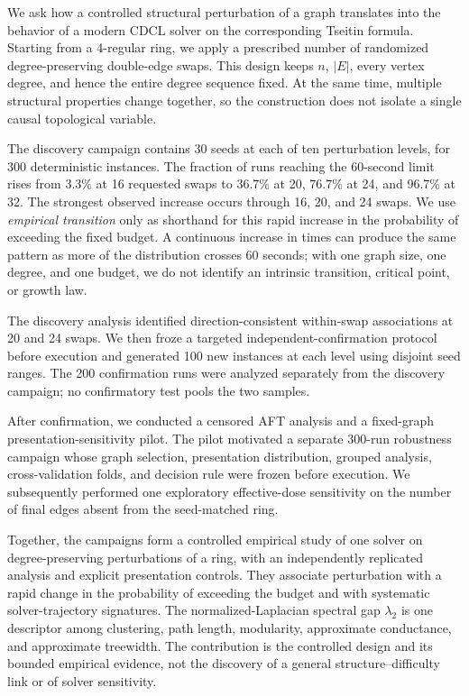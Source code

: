\documentclass[11pt]{article}
\begin{document}
We ask how a controlled structural perturbation of a graph translates into the behavior of a modern CDCL solver on the corresponding Tseitin formula. Starting from a 4-regular ring, we apply a prescribed number of randomized degree-preserving double-edge swaps. This design keeps $n$, $|E|$, every vertex degree, and hence the entire degree sequence fixed. At the same time, multiple structural properties change together, so the construction does not isolate a single causal topological variable.

The discovery campaign contains 30 seeds at each of ten perturbation levels, for 300 deterministic instances. The fraction of runs reaching the 60-second limit rises from 3.3\% at 16 requested swaps to 36.7\% at 20, 76.7\% at 24, and 96.7\% at 32. The strongest observed increase occurs through 16, 20, and 24 swaps. We use \emph{empirical transition} only as shorthand for this rapid increase in the probability of exceeding the fixed budget. A continuous increase in times can produce the same pattern as more of the distribution crosses 60 seconds; with one graph size, one degree, and one budget, we do not identify an intrinsic transition, critical point, or growth law.

The discovery analysis identified direction-consistent within-swap associations at 20 and 24 swaps. We then froze a targeted independent-confirmation protocol before execution and generated 100 new instances at each level using disjoint seed ranges. The 200 confirmation runs were analyzed separately from the discovery campaign; no confirmatory test pools the two samples.

After confirmation, we conducted a censored AFT analysis and a fixed-graph presentation-sensitivity pilot. The pilot motivated a separate 300-run robustness campaign whose graph selection, presentation distribution, grouped analysis, cross-validation folds, and decision rule were frozen before execution. We subsequently performed one exploratory effective-dose sensitivity on the number of final edges absent from the seed-matched ring.

Together, the campaigns form a controlled empirical study of one solver on degree-preserving perturbations of a ring, with an independently replicated analysis and explicit presentation controls. They associate perturbation with a rapid change in the probability of exceeding the budget and with systematic solver-trajectory signatures. The normalized-Laplacian spectral gap $\lambda_2$ is one descriptor among clustering, path length, modularity, approximate conductance, and approximate treewidth. The contribution is the controlled design and its bounded empirical evidence, not the discovery of a general structure--difficulty link or of solver sensitivity.
\end{document}
